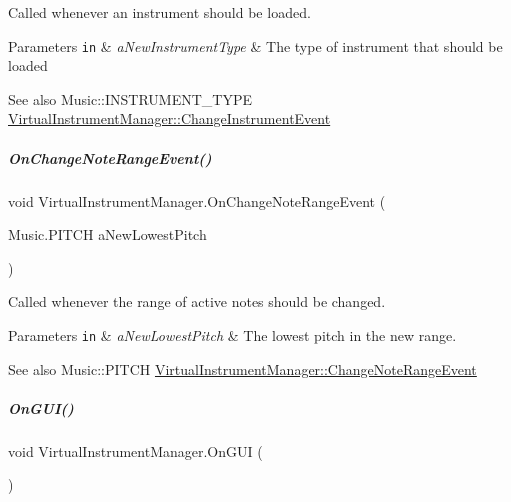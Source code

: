 Called whenever an instrument should be loaded. 


\begin{DoxyParams}[1]{Parameters}
\mbox{\tt in}  & {\em a\+New\+Instrument\+Type} & The type of instrument that should be loaded\\
\hline
\end{DoxyParams}
\begin{DoxySeeAlso}{See also}
Music\+::\+I\+N\+S\+T\+R\+U\+M\+E\+N\+T\+\_\+\+T\+Y\+PE \hyperlink{group___virtual_instrument_manager_class_virtual_instrument_manager_1_1_change_instrument_event}{Virtual\+Instrument\+Manager\+::\+Change\+Instrument\+Event} 
\end{DoxySeeAlso}
\mbox{\label{group___virtual_instrument_manager_a660c766dceebfc830de2cf96686692df}} 
\subparagraph{\texorpdfstring{On\+Change\+Note\+Range\+Event()}{OnChangeNoteRangeEvent()}}
{\footnotesize\ttfamily void Virtual\+Instrument\+Manager.\+On\+Change\+Note\+Range\+Event (\begin{DoxyParamCaption}\item[{Music.\+P\+I\+T\+CH}]{a\+New\+Lowest\+Pitch }\end{DoxyParamCaption})}



Called whenever the range of active notes should be changed. 


\begin{DoxyParams}[1]{Parameters}
\mbox{\tt in}  & {\em a\+New\+Lowest\+Pitch} & The lowest pitch in the new range.\\
\hline
\end{DoxyParams}
\begin{DoxySeeAlso}{See also}
Music\+::\+P\+I\+T\+CH \hyperlink{group___virtual_instrument_manager_class_virtual_instrument_manager_1_1_change_note_range_event}{Virtual\+Instrument\+Manager\+::\+Change\+Note\+Range\+Event} 
\end{DoxySeeAlso}
\mbox{\label{group___virtual_instrument_manager_ac64ceff10f8db3a11868f251cea72349}} 
\subparagraph{\texorpdfstring{On\+G\+U\+I()}{OnGUI()}}
{\footnotesize\ttfamily void Virtual\+Instrument\+Manager.\+On\+G\+UI (\begin{DoxyParamCaption}{ }\end{DoxyParamCaption})\hspace{0.3cm}{\ttfamily [private]}}



